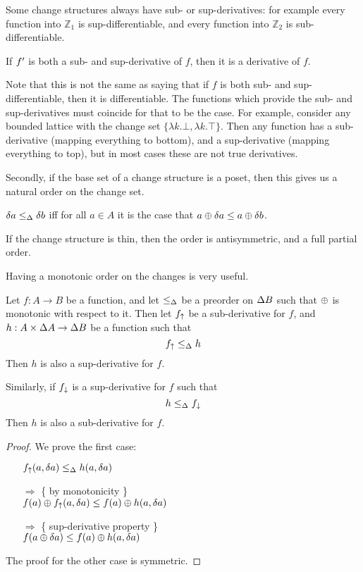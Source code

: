 Some change structures always have sub- or sup-derivatives: for example every function
into $\mathbb{Z}_1$ is sup-differentiable, and every function into $\mathbb{Z}_2$ is 
sub-differentiable.

\begin{prop}
  If $f'$ is both a sub- and sup-derivative of $f$, then it is a derivative of $f$.
\end{prop}

Note that this is not the same as saying that if $f$ is both sub- and
sup-differentiable, then it is differentiable. The functions which provide the
sub- and sup-derivatives must coincide for that to be the case. For example,
consider any bounded lattice with the change set $\{ \lambda k . \bot, \lambda k
 . \top \}$. Then any function has a sub-derivative (mapping everything to
 bottom), and a sup-derivative (mapping everything to top), but in most cases
 these are not true derivatives.

Secondly, if the base set of a change structure is a poset, then this gives us a natural
order on the change set.

\begin{defn}
  $\delta a \leq_\Delta \delta b$ iff for all $a \in A$ it is the case that $a \oplus \delta a \leq a \oplus \delta b$.
\end{defn}

If the change structure is thin, then the order is antisymmetric, and a
full partial order.

Having a monotonic order on the changes is very useful.

\begin{thm}
  Let $f: A \rightarrow B$ be a function, and let $\leq_\Delta$ be a preorder on $\Delta B$ such that $\oplus$ is monotonic with
  respect to it. Then let $f_\uparrow$ be a sub-derivative for $f$, and $h: A \times
  \Delta A \rightarrow \Delta B$ be a function such that
  $$f_\uparrow \leq_\Delta h$$
  Then $h$ is also a sup-derivative for $f$.

  Similarly, if $f_\downarrow$ is a sup-derivative for $f$ such that 
  $$h \leq_\Delta f_\downarrow$$
  Then $h$ is also a sub-derivative for $f$.
\end{thm}
\begin{proof}
  We prove the first case:
  \begin{itemize}
    \item[ ]$f_\uparrow(a, \delta a) \leq_\Delta h(a, \delta a)$
    \item[$\Rightarrow$]\{ by monotonicity \}\\
      $f(a) \oplus f_\uparrow(a, \delta a) \leq f(a) \oplus h(a, \delta a)$
    \item[$\Rightarrow$]\{ sup-derivative property \}\\
      $f(a \oplus \delta a) \leq f(a) \oplus h(a, \delta a)$
  \end{itemize}

  The proof for the other case is symmetric.
\end{proof}

